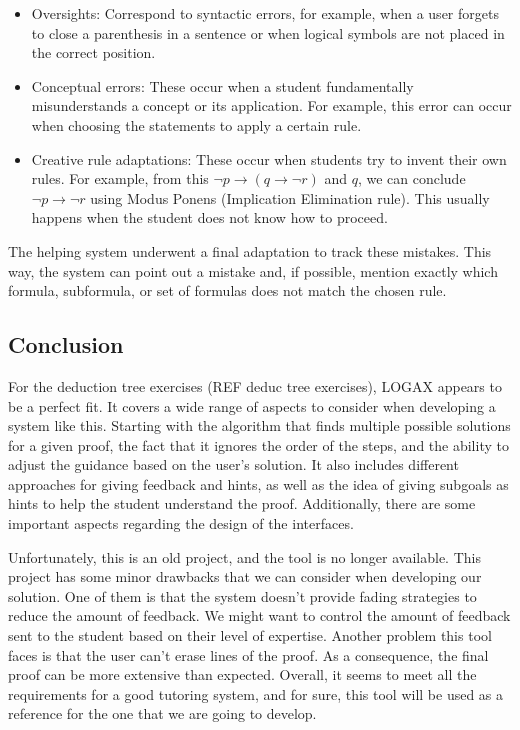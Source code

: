 \begin{itemize}
    \item Oversights: Correspond to syntactic errors, for example, when a user forgets to close a parenthesis in a sentence or when logical symbols are not placed in the correct position.
    \item Conceptual errors: These occur when a student fundamentally misunderstands a concept or its application. For example, this error can occur when choosing the statements to apply a certain rule.
    \item Creative rule adaptations: These occur when students try to invent their own rules. For example, from this \( \neg p \to (q \to \neg r) \) and \( q \), we can conclude \( \neg p \to \neg r \) using Modus Ponens (Implication Elimination rule). This usually happens when the student does not know how to proceed.
\end{itemize}

The helping system underwent a final adaptation to track these mistakes. This way, the system can point out a mistake and, if possible, mention exactly which formula, subformula, or set of formulas does not match the chosen rule.

\subsection{Conclusion}

For the deduction tree exercises (REF deduc tree exercises), LOGAX appears to be a perfect fit. It covers a wide range of aspects to consider when developing a system like this. Starting with the algorithm that finds multiple possible solutions for a given proof, the fact that it ignores the order of the steps, and the ability to adjust the guidance based on the user's solution. It also includes different approaches for giving feedback and hints, as well as the idea of giving subgoals as hints to help the student understand the proof. Additionally, there are some important aspects regarding the design of the interfaces.

Unfortunately, this is an old project, and the tool is no longer available. This project has some minor drawbacks that we can consider when developing our solution. One of them is that the system doesn't provide fading strategies to reduce the amount of feedback. We might want to control the amount of feedback sent to the student based on their level of expertise. Another problem this tool faces is that the user can't erase lines of the proof. As a consequence, the final proof can be more extensive than expected. Overall, it seems to meet all the requirements for a good tutoring system, and for sure, this tool will be used as a reference for the one that we are going to develop.

